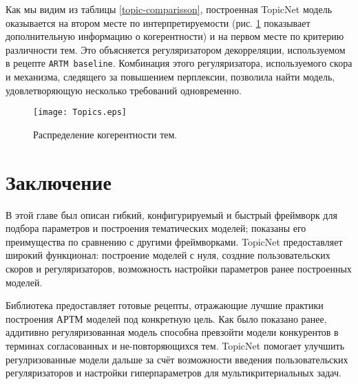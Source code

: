 Как мы видим из таблицы \ref{topic-comparisson}, построенная TopicNet модель  оказывается на втором месте по интерпретируемости (рис. \ref{topics_distribution} показывает дополнительную информацию о когерентности) и на первом месте по критерию различности тем. Это объясняется регуляризатором декорреляции, используемом в рецепте \texttt{ARTM baseline}. Комбинация этого регуляризатора, используемого скора и механизма, следящего за повышением перплексии, позволила найти модель, удовлетворяющую несколько требований одновременно.

\begin{figure}[!ht]
    \centering
    \texttt{[image: Topics.eps]}
    \caption{Распределение когерентности тем.}
\label{topics_distribution}
\end{figure}




\section{Заключение}
В этой главе был описан гибкий, конфигурируемый и быстрый фреймворк для подбора параметров и построения тематических моделей; показаны его преимущества по сравнению с другими фреймворками. TopicNet предоставляет широкий функционал: построение моделей с нуля, создние пользовательских скоров и регуляризаторов, возможность настройки параметров ранее построенных моделей.

Библиотека предоставляет готовые рецепты, отражающие лучшие практики построения АРТМ моделей под конкретную цель. Как было показано ранее, аддитивно регуляризованная модель способна превзойти модели конкурентов в терминах согласованных и не-повторяющихся тем. TopicNet помогает улучшить регулризованные модели дальше за счёт возможности введения пользовательских регуляризаторов и настройки гиперпараметров для мультикритериальных задач. 


